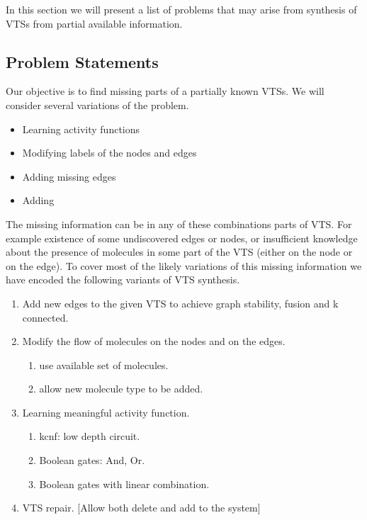 In this section we will present a list of problems that may arise from
synthesis of VTSs from partial available information.

\subsection{Problem Statements}


Our objective is to find missing parts of a partially known VTSs.
%
We will consider several variations of the problem.
%
\begin{itemize}
\item Learning activity functions
\item Modifying labels of the nodes and edges
\item Adding missing edges
\item Adding
\end{itemize}


The missing information can be in any of these combinations parts of VTS. For example existence of some undiscovered edges or nodes, or insufficient knowledge about the presence of molecules in some part of the VTS (either on the node or on the edge). To cover most of the likely variations of this missing information we have encoded the following variants of VTS synthesis.
%
%
\begin{enumerate}[label=\Alph*]
\item  Add new edges to the given VTS to achieve graph stability, fusion and k connected. 
\item  Modify the flow of molecules on the nodes and on the edges.
  \begin{enumerate}
  	\item use available set of molecules.
    \item allow new molecule type to be added.     
  \end{enumerate}        
\item Learning meaningful activity function. 
  \begin{enumerate}
    \item kcnf: low depth circuit.
    \item Boolean gates: And, Or.
    \item Boolean gates with linear combination.  
    \end{enumerate}        
\item  VTS repair. [Allow both delete and add to the system]
\end{enumerate}


